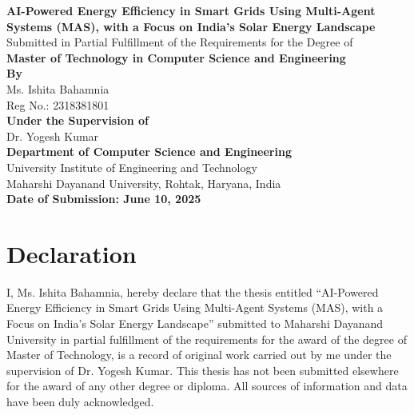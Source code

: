 \documentclass[12pt, a4paper, oneside]{book}
\begin{document}
\begin{titlepage}
    \centering
    \vspace*{2cm}
    {\Large \textbf{AI-Powered Energy Efficiency in Smart Grids Using Multi-Agent Systems (MAS), with a Focus on India’s Solar Energy Landscape}}\\
    \vspace{1.5cm}
    {\large Submitted in Partial Fulfillment of the Requirements for the Degree of}\\
    {\large \textbf{Master of Technology in Computer Science and Engineering}}\\
    \vspace{1cm}
    {\large \textbf{By}}\\
    {\large Ms. Ishita Bahamnia}\\
    {\large Reg No.: 2318381801}\\
    \vspace{1cm}
    {\large \textbf{Under the Supervision of}}\\
    {\large Dr. Yogesh Kumar}\\
    \vspace{1cm}
    {\large \textbf{Department of Computer Science and Engineering}}\\
    {\large University Institute of Engineering and Technology}\\
    {\large Maharshi Dayanand University, Rohtak, Haryana, India}\\
    \vspace{1.5cm}
    {\large \textbf{Date of Submission: June 10, 2025}}\\
\end{titlepage}

\chapter*{Declaration}
I, Ms. Ishita Bahamnia, hereby declare that the thesis entitled ``AI-Powered Energy Efficiency in Smart Grids Using Multi-Agent Systems (MAS), with a Focus on India’s Solar Energy Landscape'' submitted to Maharshi Dayanand University in partial fulfillment of the requirements for the award of the degree of Master of Technology, is a record of original work carried out by me under the supervision of Dr. Yogesh Kumar. This thesis has not been submitted elsewhere for the award of any other degree or diploma. All sources of information and data have been duly acknowledged.
\end{document}
